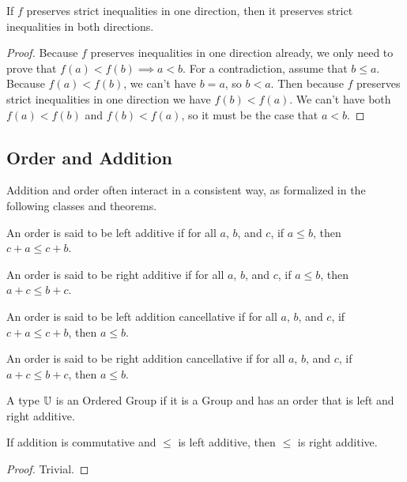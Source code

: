 \documentclass[../math.tex]{subfiles}
\begin{document}
\begin{instance} \label{homo-lt-lt2}
    If $f$ preserves strict inequalities in one direction, then it preserves
    strict inequalities in both directions.
\end{instance}
\begin{proof}
    Because $f$ preserves inequalities in one direction already, we only need to
    prove that $f(a) < f(b) \implies a < b$.  For a contradiction, assume that
    $b \leq a$.  Because $f(a) < f(b)$, we can't have $b = a$, so $b < a$.  Then
    because $f$ preserves strict inequalities in one direction we have $f(b) <
    f(a)$.  We can't have both $f(a) < f(b)$ and $f(b) < f(a)$, so it must be
    the case that $a < b$.
\end{proof}

\subsection{Order and Addition}

Addition and order often interact in a consistent way, as formalized in the
following classes and theorems.

\begin{class}
    An order is said to be left additive if for all $a$, $b$, and $c$, if $a
    \leq b$, then $c + a \leq c + b$.
\end{class}

\begin{class}
    An order is said to be right additive if for all $a$, $b$, and $c$, if $a
    \leq b$, then $a + c \leq b + c$.
\end{class}

\begin{class}
    An order is said to be left addition cancellative if for all $a$, $b$, and
    $c$, if $c + a \leq c + b$, then $a \leq b$.
\end{class}

\begin{class}
    An order is said to be right addition cancellative if for all $a$, $b$, and
    $c$, if $a + c \leq b + c$, then $a \leq b$.
\end{class}

\begin{class}
    A type $\mathbb{U}$ is an Ordered Group if it is a Group and has an order that is
    left and right additive.
\end{class}

\begin{instance}
    If addition is commutative and $\leq$ is left additive, then $\leq$ is right
    additive.
\end{instance}
\begin{proof}
    Trivial.
\end{proof}
\end{document}
